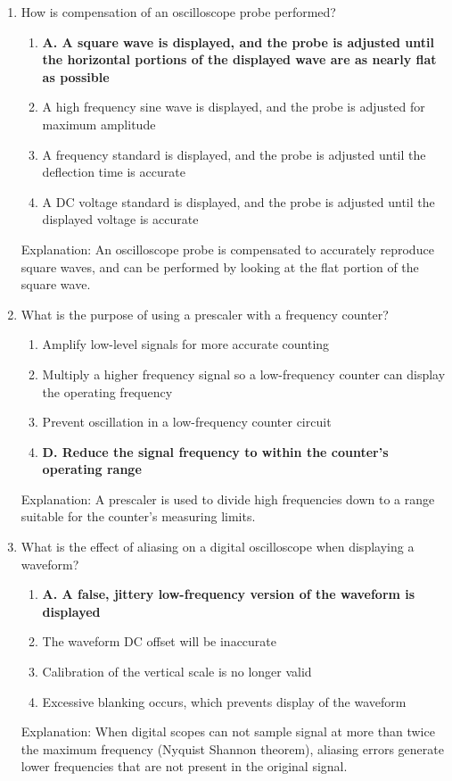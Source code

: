 \begin{enumerate}
      \item How is compensation of an oscilloscope probe performed?
        \begin{enumerate}
       \item \textbf{A. A square wave is displayed, and the probe is adjusted until the horizontal portions of the displayed wave are as nearly flat as possible}
       \item  A high frequency sine wave is displayed, and the probe is adjusted for maximum amplitude
      \item  A frequency standard is displayed, and the probe is adjusted until the deflection time is accurate
    \item  A DC voltage standard is displayed, and the probe is adjusted until the displayed voltage is accurate
        \end{enumerate}
    \textcolor{myred}{Explanation:}
      An oscilloscope probe is compensated to accurately reproduce square waves, and can be performed by looking at the flat portion of the square wave.
        
    \item What is the purpose of using a prescaler with a frequency counter?
      \begin{enumerate}
      \item  Amplify low-level signals for more accurate counting
     \item  Multiply a higher frequency signal so a low-frequency counter can display the operating frequency
   \item  Prevent oscillation in a low-frequency counter circuit
       \item \textbf{D. Reduce the signal frequency to within the counter's operating range}
        \end{enumerate}
          \textcolor{myred}{Explanation:}
        A prescaler is used to divide high frequencies down to a range suitable for the counter's measuring limits.
        
   \item What is the effect of aliasing on a digital oscilloscope when displaying a waveform?
      \begin{enumerate}
      \item \textbf{A. A false, jittery low-frequency version of the waveform is displayed}
        \item  The waveform DC offset will be inaccurate
      \item  Calibration of the vertical scale is no longer valid
         \item  Excessive blanking occurs, which prevents display of the waveform
        \end{enumerate}
          \textcolor{myred}{Explanation:}
    When digital scopes can not sample signal at more than twice the maximum frequency (Nyquist Shannon theorem), aliasing errors generate lower frequencies that are not present in the original signal.
   

\end{enumerate}
